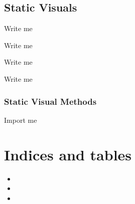 \documentclass[letterpaper,10pt,english]{sphinxmanual}
\begin{document}
\section{Static Visuals}
\label{\detokenize{Sub-Packages:static-visuals}}\label{\detokenize{Sub-Packages:static-visuals-module}}
\begin{DUlineblock}{0em}
\item[] Write me
\item[] Write me
\item[] Write me
\item[] Write me
\end{DUlineblock}


\subsection{Static Visual Methods}
\label{\detokenize{Sub-Packages:static-visual-methods}}
\begin{DUlineblock}{0em}
\item[] Import me
\end{DUlineblock}


\chapter{Indices and tables}
\label{\detokenize{index:indices-and-tables}}\begin{itemize}
\item {} 
\sphinxAtStartPar
{}

\item {} 
\sphinxAtStartPar
{}

\item {} 
\sphinxAtStartPar
{}

\end{itemize}


\renewcommand{\indexname}{Python Module Index}
\begin{sphinxtheindex}
\let\bigletter\sphinxstyleindexlettergroup
\bigletter{c}
\item\relax{}
\item\relax{}
\item\relax{}
\end{sphinxtheindex}

\renewcommand{\indexname}{Index}
\printindex
\end{document}

